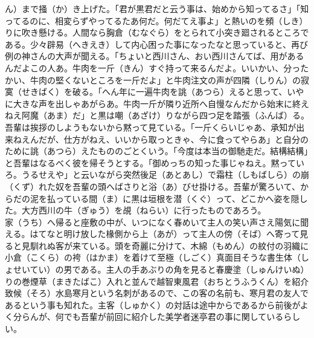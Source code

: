 \documentclass{book}
\begin{document}
ん）まで掻（か）き上げた。「君が黒君だと云う事は、始めから知ってるさ」「知ってるのに、相変らずやってるたあ何だ。何だてえ事よ」と熱いのを頻（しき）りに吹き懸ける。人間なら胸倉（むなぐら）をとられて小突き廻されるところである。少々辟易（へきえき）して内心困った事になったなと思っていると、再び例の神さんの大声が聞える。「ちょいと西川さん、おい西川さんてば、用があるんだよこの人あ。牛肉を一斤（きん）すぐ持って来るんだよ。いいかい、分ったかい、牛肉の堅くないところを一斤だよ」と牛肉注文の声が四隣（しりん）の寂寞（せきばく）を破る。「へん年に一遍牛肉を誂（あつら）えると思って、いやに大きな声を出しゃあがらあ。牛肉一斤が隣り近所へ自慢なんだから始末に終えねえ阿魔（あま）だ」と黒は嘲（あざけ）りながら四つ足を踏張（ふんば）る。吾輩は挨拶のしようもないから黙って見ている。「一斤くらいじゃあ、承知が出来ねえんだが、仕方がねえ、いいから取っときゃ、今に食ってやらあ」と自分のために誂（あつら）えたもののごとくいう。「今度は本当の御馳走だ。結構結構」と吾輩はなるべく彼を帰そうとする。「御めっちの知った事じゃねえ。黙っていろ。うるせえや」と云いながら突然後足（あとあし）で霜柱（しもばしら）の崩（くず）れた奴を吾輩の頭へばさりと浴（あ）びせ掛ける。吾輩が驚ろいて、からだの泥を払っている間（ま）に黒は垣根を潜（くぐ）って、どこかへ姿を隠した。大方西川の牛（ぎゅう）を覘（ねらい）に行ったものであろう。\\
家（うち）へ帰ると座敷の中が、いつになく春めいて主人の笑い声さえ陽気に聞える。はてなと明け放した椽側から上（あが）って主人の傍（そば）へ寄って見ると見馴れぬ客が来ている。頭を奇麗に分けて、木綿（もめん）の紋付の羽織に小倉（こくら）の袴（はかま）を着けて至極（しごく）真面目そうな書生体（しょせいてい）の男である。主人の手あぶりの角を見ると春慶塗（しゅんけいぬ）りの巻煙草（まきたばこ）入れと並んで越智東風君（おちとうふうくん）を紹介致候（そろ）水島寒月という名刺があるので、この客の名前も、寒月君の友人であるという事も知れた。主客（しゅかく）の対話は途中からであるから前後がよく分らんが、何でも吾輩が前回に紹介した美学者迷亭君の事に関しているらしい。\\
\end{document}
